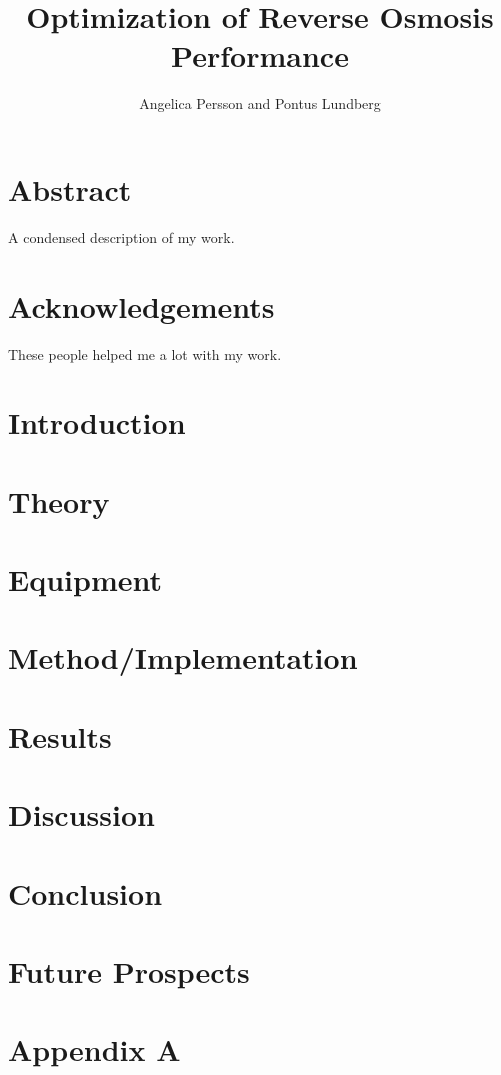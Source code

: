 \documentclass{LTHthesis}
\begin{document}
\begin{titlepages}
\author{Angelica Persson and Pontus Lundberg}
\title{Optimization of Reverse Osmosis Performance}
\end{titlepages}
\chapter*{Abstract}
A condensed description of my work.
\chapter*{Acknowledgements}
These people helped me a lot with my work.

\tableofcontents





\chapter{Introduction}



\chapter{Theory}


\chapter{Equipment}


\chapter{Method/Implementation}


\chapter{Results}


\chapter{Discussion}


\chapter{Conclusion}


\chapter{Future Prospects}


\printbibliography 
\clearpage
\appendix
\chapter{Appendix A} 
\label{A}
%
\end{document}
